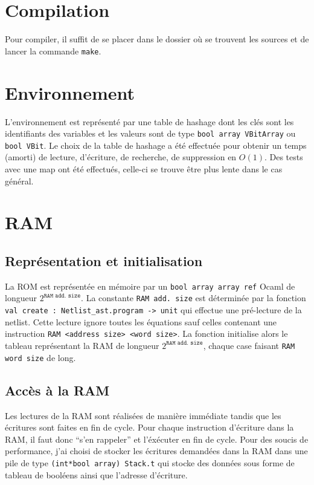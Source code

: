\documentclass{article}
\newcommand{\code}[1]{\colorbox{JungleGreen}{\texttt{#1}}}
\begin{document}
\section{Compilation}
Pour compiler, il suffit de se placer dans le dossier où se trouvent
les sources et de lancer la commande \code{make}.

\section{Environnement}
\label{sec:environnement}

L'environnement est représenté par une table de hashage dont les clés
sont les identifiants des variables et les valeurs sont de type
\texttt{bool array VBitArray} ou \texttt{bool VBit}. Le choix de la
table de hashage a été effectuée pour obtenir un temps (amorti) de
lecture, d'écriture, de recherche, de suppression en $O(1)$. Des tests avec une
map ont été effectués, celle-ci se trouve être plus lente dans le cas
général. 


\section{RAM}
\label{sec:ram}

\subsection{Représentation et initialisation}
La ROM est représentée en mémoire par un \code{bool array array ref}
Ocaml de longueur $2^\texttt{RAM add. size}$. La constante \texttt{RAM
add. size} est déterminée par la fonction \code{val create :
Netlist\_ast.program -> unit} qui effectue une pré-lecture de la
netlist. Cette lecture ignore toutes les équations sauf celles
contenant une instruction \code{RAM <address size> <word size>}. La
fonction initialise alors le tableau représentant la RAM de longueur
$2^\texttt{RAM add. size}$, chaque case faisant \texttt{RAM word
  size} de long.

\subsection{Accès à la RAM}
Les lectures de la RAM sont réalisées de manière immédiate tandis que
les écritures sont faites en fin de cycle. Pour chaque instruction
d'écriture dans la RAM, il faut donc ``s'en rappeler'' et l'éxécuter
en fin de cycle. Pour des soucis de performance, j'ai choisi de
stocker les écritures demandées dans la RAM dans une pile de type
\code{(int*bool array) Stack.t} qui stocke des données sous forme de
tableau de booléens ainsi que l'adresse d'écriture. 
\end{document}
